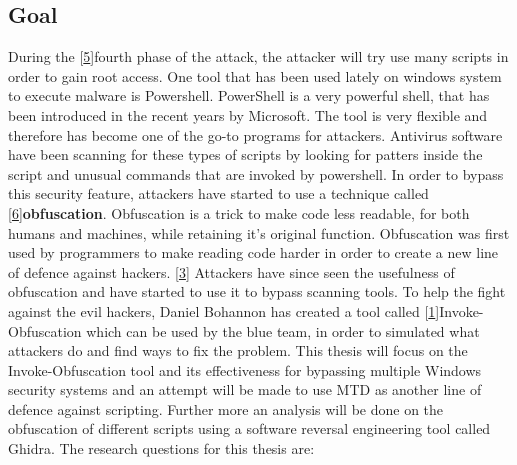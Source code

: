 \documentclass{article}%
\begin{document}
\subsection{Goal}
During the [\hyperlink{5}{5}]fourth phase of the attack, the attacker will try use many scripts in order to gain root access. One tool that has been used lately on windows system to execute malware is Powershell. PowerShell is a very powerful shell, that has been introduced in the recent years by Microsoft. The tool is very flexible and therefore has become one of the go-to programs for attackers. Antivirus software have been scanning for these types of scripts by looking for patters inside the script and unusual commands that are invoked by powershell. In order to bypass this security feature, attackers have started to use a technique called [\hyperlink{6}{6}]\textbf{obfuscation}. Obfuscation is a trick to make code less readable, for both humans and machines, while retaining it's original function. Obfuscation was first used by programmers to make reading code harder in order to create a new line of defence against hackers. [\hyperlink{3}{3}] Attackers have since seen the usefulness of obfuscation and have started to use it to bypass scanning tools. To help the fight against the evil hackers, Daniel Bohannon has created a tool called [\hyperlink{1}{1}]Invoke-Obfuscation which can be used by the blue team, in order to simulated what attackers do and find ways to fix the problem. This thesis will focus on the Invoke-Obfuscation tool and its effectiveness for bypassing multiple Windows security systems and an attempt will be made to use MTD as another line of defence against scripting. Further more an analysis will be done on the obfuscation of different scripts using a software reversal engineering tool called Ghidra. The research questions for this thesis are:
\end{document}
